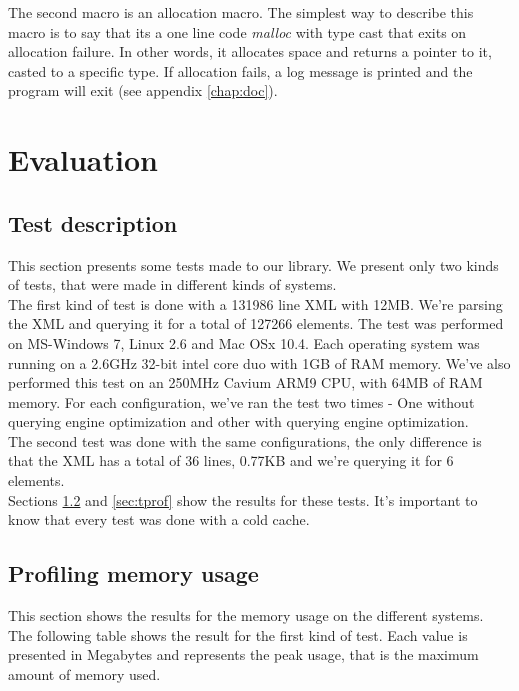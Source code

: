 \documentclass[a4paper]{report}
\begin{document}
		The second macro is an allocation macro. The simplest way to describe this macro is to say that its a one line code \emph{malloc} with type cast that exits on allocation failure. In other words, it allocates space and returns a pointer to it, casted to a specific type. If allocation fails, a log message is printed and the program will exit (see appendix \ref{chap:doc}).


\chapter{Evaluation}\label{chap:eval}

\section{Test description}\label{sec:testdesc}
	This section presents some tests made to our library. We present only two kinds of tests, that were made in different kinds of systems.\\

	The first kind of test is done with a 131986 line XML with 12MB. We're parsing the XML and querying it for a total of 127266 elements. The test was performed on MS-Windows 7, Linux 2.6 and Mac OSx 10.4. Each
	operating system was running on a 2.6GHz 32-bit intel core duo with 1GB of RAM memory. We've also performed this test on an 250MHz Cavium ARM9 CPU, with 64MB of RAM memory. For each configuration, we've ran
	the test two times - One without querying engine optimization and other with querying engine optimization. \\

	The second test was done with the same configurations, the only difference is that the XML has a total of 36 lines, 0.77KB and we're querying it for 6 elements.\\

	Sections \ref{sec:mprof} and \ref{sec:tprof} show the results for these tests. It's important to know that every test was done with a cold cache.

\section{Profiling memory usage}\label{sec:mprof}
	This section shows the results for the memory usage on the different systems. The following table shows the result for the first kind of test. Each value is presented in Megabytes and represents the peak usage, that is the maximum amount of memory used.
\end{document}
